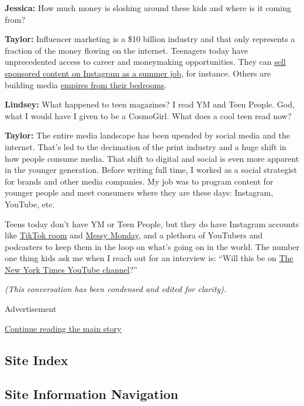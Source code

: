 \textbf{Jessica:} How much money is sloshing around these kids and where
is it coming from?

\textbf{Taylor:} Influencer marketing is a \$10 billion industry and
that only represents a fraction of the money flowing on the internet.
Teenagers today have unprecedented access to career and moneymaking
opportunities. They can
\href{https://www.theatlantic.com/technology/archive/2018/08/posting-instagram-sponsored-content-is-the-new-summer-job/568108/}{sell
sponsored content on Instagram as a summer job}, for instance. Others
are building media
\href{https://www.nytimes.com/2019/11/29/style/the-clout.html}{empires
from their bedrooms}.

\textbf{Lindsey:} What happened to teen magazines? I read YM and Teen
People. God, what I would have I given to be a CosmoGirl. What does a
cool teen read now?

\textbf{Taylor:} The entire media landscape has been upended by social
media and the internet. That's led to the decimation of the print
industry and a huge shift in how people consume media. That shift to
digital and social is even more apparent in the younger generation.
Before writing full time, I worked as a social strategist for brands and
other media companies. My job was to program content for younger people
and meet consumers where they are these days: Instagram, YouTube, etc.

Teens today don't have YM or Teen People, but they do have Instagram
accounts like \href{https://www.instagram.com/tiktokroom/}{TikTok room}
and \href{https://www.instagram.com/m3ssym0nday/}{Messy Monday}, and a
plethora of YouTubers and podcasters to keep them in the loop on what's
going on in the world. The number one thing kids ask me when I reach out
for an interview is: ``Will this be on
\href{https://www.youtube.com/user/TheNewYorkTimes}{The New York Times
YouTube channel}?''

\emph{(This conversation has been condensed and edited for clarity).}

Advertisement

\protect\hyperlink{after-bottom}{Continue reading the main story}

\hypertarget{site-index}{%
\subsection{Site Index}\label{site-index}}

\hypertarget{site-information-navigation}{%
\subsection{Site Information
Navigation}\label{site-information-navigation}}


